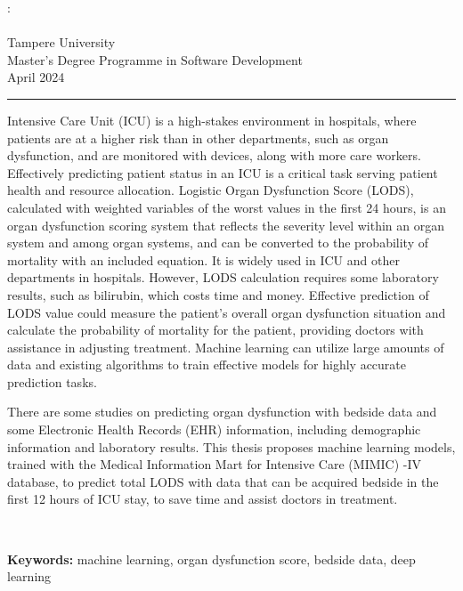 \documentclass[12pt,a4paper,english
]{tunithesis}
\begin{document}
\begin{spacing}{1.0}
\noindent \@author: \@title\\
\@thesistype\\
Tampere University\\
Master’s Degree Programme in Software Development\\
April 2024
\end{spacing}
\noindent\rule{12cm}{0.4pt}

\vspace{0.5cm}


\noindent Intensive Care Unit (ICU) is a high-stakes environment in hospitals, where patients are at a higher risk than in other departments, such as organ dysfunction, and are monitored with devices, along with more care workers. Effectively predicting patient status in an ICU is a critical task serving patient health and resource allocation. Logistic Organ Dysfunction Score (LODS), calculated with weighted variables of the worst values in the first 24 hours, is an organ dysfunction scoring system that reflects the severity level within an organ system and among organ systems, and can be converted to the probability of mortality with an included equation. It is widely used in ICU and other departments in hospitals. However, LODS calculation requires some laboratory results, such as bilirubin, which costs time and money. Effective prediction of LODS value could measure the patient's overall organ dysfunction situation and calculate the probability of mortality for the patient, providing doctors with assistance in adjusting treatment. Machine learning can utilize large amounts of data and existing algorithms to train effective models for highly accurate prediction tasks.

\noindent There are some studies on predicting organ dysfunction with bedside data and some Electronic Health Records (EHR) information, including demographic information and laboratory results. This thesis proposes machine learning models, trained with the Medical Information Mart for Intensive Care (MIMIC) -IV database, to predict total LODS with data that can be acquired bedside in the first 12 hours of ICU stay, to save time and assist doctors in treatment. 




~

\noindent\textbf{Keywords:} machine learning, organ dysfunction score, bedside data, deep learning
\end{document}
